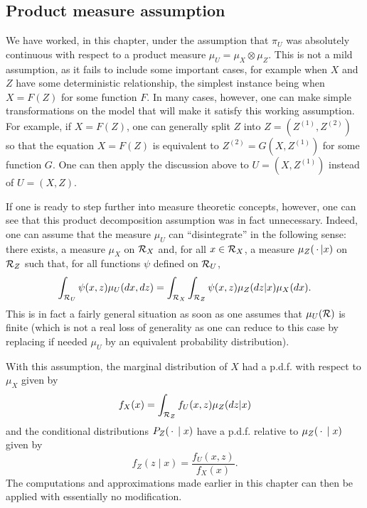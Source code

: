\subsection{Product measure assumption}
We have worked, in this chapter, under the assumption that $\pi_U$ was absolutely continuous with respect to a product measure $\mu_U = \mu_X \otimes \mu_Z$. This is not a mild assumption, as it fails to include some important cases, for example when $X$ and $Z$ have some deterministic relationship, the simplest instance being when $X = F(Z)$ for some function $F$. In many cases, however, one can make simple transformations on the model that will make it satisfy this working assumption.   For example, if $X = F(Z)$, one can generally split $Z$ into $Z = (Z^{(1)}, Z^{(2)})$ so that the equation $X = F(Z)$ is equivalent to $Z^{(2)} = G(X, Z^{(1)})$ for some function $G$. One can then apply the discussion above to $U = (X,Z^{(1)})$ instead of $U = (X,Z)$. 

If one is ready to step further into measure theoretic concepts, however, one can see that this product decomposition assumption was in fact unnecessary. Indeed, one can assume that the measure $\mu_U$ can ``disintegrate'' in the following sense: there exists, a measure $\mu_X$ on ${\mathcal R}_X$ and, for all $x\in {\mathcal R}_X$, a measure $\mu_Z(\,\cdot\,|x)$ on ${\mathcal R}_Z$ such that, for all functions $\psi$ defined on ${\mathcal R}_U$, 
\[
\int_{{\mathcal R}_U} \psi(x,z) \mu_U(dx,dz) = \int_{{\mathcal R}_X} \int_{{\mathcal R}_Z} \psi(x,z) \mu_Z(dz|x) \mu_X(dx).
\]
This is in fact a fairly general situation \citep{bogachev2007measure} as soon as one assumes that $\mu_U({\mathcal R})$ is finite (which is not a real loss of generality as one can  reduce to this case by replacing if needed $\mu_U$ by an equivalent probability distribution). 

With this assumption, the marginal distribution of $X$ had a p.d.f. with respect to $\mu_X$ given by
\[
f_X(x) = \int_{{\mathcal R}_Z} f_U(x,z) \mu_Z(dz|x)
\]
and the conditional distributions $P_Z(\,\cdot\,\mid x)$ have a p.d.f. relative to $\mu_Z(\,\cdot\,\mid x)$ given by
\[
f_Z(z\mid x) = \frac{f_U(x,z)}{f_X(x)}. 
\]
The computations and approximations made earlier in this chapter can then be applied with essentially no modification. 


